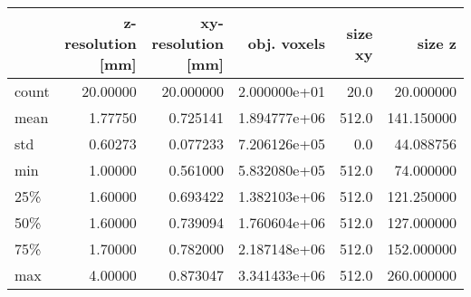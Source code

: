 \begin{tabular}{lrrrrr}
\toprule
{} &  z-resolution [mm] &  xy-resolution [mm] &   obj. voxels &  size xy &      size z \\
\midrule
count &           20.00000 &           20.000000 &  2.000000e+01 &     20.0 &   20.000000 \\
mean  &            1.77750 &            0.725141 &  1.894777e+06 &    512.0 &  141.150000 \\
std   &            0.60273 &            0.077233 &  7.206126e+05 &      0.0 &   44.088756 \\
min   &            1.00000 &            0.561000 &  5.832080e+05 &    512.0 &   74.000000 \\
25\%   &            1.60000 &            0.693422 &  1.382103e+06 &    512.0 &  121.250000 \\
50\%   &            1.60000 &            0.739094 &  1.760604e+06 &    512.0 &  127.000000 \\
75\%   &            1.70000 &            0.782000 &  2.187148e+06 &    512.0 &  152.000000 \\
max   &            4.00000 &            0.873047 &  3.341433e+06 &    512.0 &  260.000000 \\
\bottomrule
\end{tabular}
